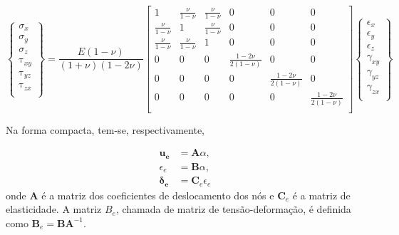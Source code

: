 \begin{equation} \label{eq:elasticitymatrix}
    \begin{Bmatrix}
        \sigma_{x} \\
        \sigma_{y} \\
        \sigma_{z} \\
        \uptau_{xy} \\
        \uptau_{yz} \\
        \uptau_{zx} \\
    \end{Bmatrix} 
    =
    \frac{E(1 - \nu)}{(1+\nu)(1 - 2\nu)}
    \begin{bmatrix}
        1 & \frac{\nu}{1-\nu} & \frac{\nu}{1-\nu} & 0 & 0 & 0 \\
        \frac{\nu}{1-\nu} & 1 & \frac{\nu}{1-\nu} & 0 & 0 & 0 \\
        \frac{\nu}{1-\nu} & \frac{\nu}{1-\nu} & 1 & 0 & 0 & 0 \\
        0 & 0 & 0 & \frac{1-2\nu}{2(1-\nu)} & 0 & 0 \\
        0 & 0 & 0 & 0 & \frac{1-2\nu}{2(1-\nu)} & 0 \\
        0 & 0 & 0 & 0 & 0 & \frac{1-2\nu}{2(1-\nu)} \\
    \end{bmatrix}
    
    \begin{Bmatrix}
        \epsilon_{x}\\
        \epsilon_{y}\\
        \epsilon_{z}\\
        \gamma_{xy}\\
        \gamma_{yz}\\
        \gamma_{zx}\\
    \end{Bmatrix}
\end{equation}

Na forma compacta, tem-se, respectivamente,

\begin{equation} \label{eq:simplifiedeq}
    \begin{aligned}
      \pmb{u_{e}} &= \pmb{A}\alpha, \\
      \epsilon_{e} &= \pmb{B}\alpha, \\
      \pmb{\delta_{e}} &= \pmb{C}_{e} \epsilon_{e}
    \end{aligned}
\end{equation}
onde $\pmb{A}$ é a matriz dos coeficientes de deslocamento dos nós e
$\pmb{C}_{e}$ é a matriz de elasticidade. A matriz $B_{e}$, chamada de matriz de tensão-deformação, é definida como $\pmb{B}_e = \pmb{B}\pmb{A}^{-1}$.

